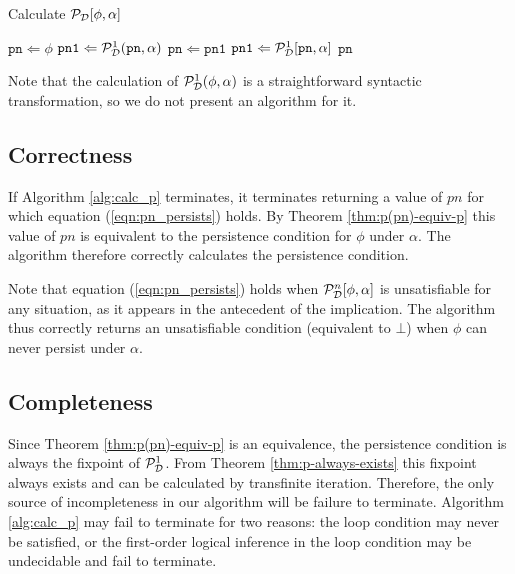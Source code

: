 %
\begin{algorithm}
\caption{Calculate $\mathcal{P}_{\mathcal{D}}[\phi,\alpha]$}


\label{alg:calc_p} \begin{algorithmic} \STATE $\mathtt{pn}\Leftarrow\phi$
\STATE $\mathtt{pn1}\Leftarrow\mathcal{P}_{\mathcal{D}}^{1}(\mathtt{pn},\alpha)$
\STATE $\mathtt{pn}\Leftarrow\mathtt{pn1}$ \STATE $\mathtt{pn1}\Leftarrow\mathcal{P}_{\mathcal{D}}^{1}[\mathtt{pn},\alpha]$
\ENDWHILE \RETURN $\mathtt{pn}$ \end{algorithmic} 
\end{algorithm}


Note that the calculation of $\mathcal{P}_{\mathcal{D}}^{1}(\phi,\alpha)$
is a straightforward syntactic transformation, so we do not present
an algorithm for it.


\subsection{Correctness}

If Algorithm \ref{alg:calc_p} terminates, it terminates returning
a value of $pn$ for which equation (\ref{eqn:pn_persists}) holds.
By Theorem \ref{thm:p(pn)-equiv-p} this value of $pn$ is equivalent
to the persistence condition for $\phi$ under $\alpha$. The algorithm
therefore correctly calculates the persistence condition.

Note that equation (\ref{eqn:pn_persists}) holds when $\mathcal{P}_{\mathcal{D}}^{n}[\phi,\alpha]$
is unsatisfiable for any situation, as it appears in the antecedent
of the implication. The algorithm thus correctly returns an unsatisfiable
condition (equivalent to $\bot$) when $\phi$ can never persist under
$\alpha$.


\subsection{Completeness}

Since Theorem \ref{thm:p(pn)-equiv-p} is an equivalence, the persistence
condition is always the fixpoint of $\mathcal{P}^{1}_{\mathcal{D}}$. From Theorem \ref{thm:p-always-exists}
this fixpoint always exists and can be calculated by transfinite iteration.
Therefore, the only source of incompleteness in our algorithm will
be failure to terminate. Algorithm \ref{alg:calc_p} may fail to terminate
for two reasons: the loop condition may never be satisfied, or the
first-order logical inference in the loop condition may be undecidable
and fail to terminate.

